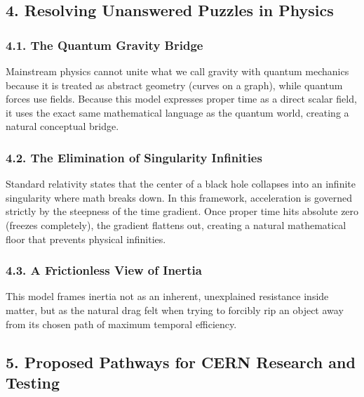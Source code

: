 \documentclass[
  10pt,
]{article}
\begin{document}
\hypertarget{resolving-unanswered-puzzles-in-physics}{%
\subsection{4. Resolving Unanswered Puzzles in
Physics}\label{resolving-unanswered-puzzles-in-physics}}

\hypertarget{the-quantum-gravity-bridge}{%
\subsubsection{4.1. The Quantum Gravity
Bridge}\label{the-quantum-gravity-bridge}}

Mainstream physics cannot unite what we call gravity with quantum
mechanics because it is treated as abstract geometry (curves on a
graph), while quantum forces use fields. Because this model expresses
proper time as a direct scalar field, it uses the exact same
mathematical language as the quantum world, creating a natural
conceptual bridge.

\hypertarget{the-elimination-of-singularity-infinities}{%
\subsubsection{4.2. The Elimination of Singularity
Infinities}\label{the-elimination-of-singularity-infinities}}

Standard relativity states that the center of a black hole collapses
into an infinite \textquotesingle singularity\textquotesingle{} where
math breaks down. In this framework, acceleration is governed strictly
by the steepness of the time gradient. Once proper time hits absolute
zero (freezes completely), the gradient flattens out, creating a natural
mathematical floor that prevents physical infinities.

\hypertarget{a-frictionless-view-of-inertia}{%
\subsubsection{4.3. A Frictionless View of
Inertia}\label{a-frictionless-view-of-inertia}}

This model frames inertia not as an inherent, unexplained resistance
inside matter, but as the natural drag felt when trying to forcibly rip
an object away from its chosen path of maximum temporal efficiency.

\hypertarget{proposed-pathways-for-cern-research-and-testing}{%
\subsection{5. Proposed Pathways for CERN Research and
Testing}\label{proposed-pathways-for-cern-research-and-testing}}
\end{document}
